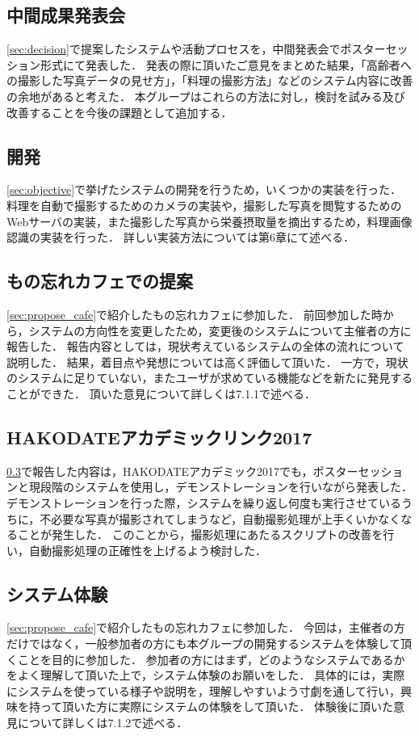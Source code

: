 \documentclass[../report]{subfiles}
\begin{document}
\subsection{中間成果発表会}
\ref{sec:decision}で提案したシステムや活動プロセスを，中間発表会でポスターセッション形式にて発表した．
発表の際に頂いたご意見をまとめた結果，「高齢者への撮影した写真データの見せ方」，「料理の撮影方法」などのシステム内容に改善の余地があると考えた．
本グループはこれらの方法に対し，検討を試みる及び改善することを今後の課題として追加する．

\subsection{開発}
\ref{sec:objective}で挙げたシステムの開発を行うため，いくつかの実装を行った．
料理を自動で撮影するためのカメラの実装や，撮影した写真を閲覧するためのWebサーバの実装，また撮影した写真から栄養摂取量を摘出するため，料理画像認識の実装を行った．
詳しい実装方法については第6章にて述べる．

\subsection{もの忘れカフェでの提案} \label{sec:propose_cafe2}
\ref{sec:propose_cafe}で紹介したもの忘れカフェに参加した．
前回参加した時から，システムの方向性を変更したため，変更後のシステムについて主催者の方に報告した．
報告内容としては，現状考えているシステムの全体の流れについて説明した．
結果，着目点や発想については高く評価して頂いた．
一方で，現状のシステムに足りていない，またユーザが求めている機能などを新たに発見することができた．
頂いた意見について詳しくは7.1.1で述べる．

\subsection{HAKODATEアカデミックリンク2017}
\ref{sec:propose_cafe2}で報告した内容は，HAKODATEアカデミック2017でも，ポスターセッションと現段階のシステムを使用し，デモンストレーションを行いながら発表した．
デモンストレーションを行った際，システムを繰り返し何度も実行させているうちに，不必要な写真が撮影されてしまうなど，自動撮影処理が上手くいかなくなることが発生した．
このことから，撮影処理にあたるスクリプトの改善を行い，自動撮影処理の正確性を上げるよう検討した．

\subsection{システム体験}
\ref{sec:propose_cafe}で紹介したもの忘れカフェに参加した．
今回は，主催者の方だけではなく，一般参加者の方にも本グループの開発するシステムを体験して頂くことを目的に参加した．
参加者の方にはまず，どのようなシステムであるかをよく理解して頂いた上で，システム体験のお願いをした．
具体的には，実際にシステムを使っている様子や説明を，理解しやすいよう寸劇を通して行い，興味を持って頂いた方に実際にシステムの体験をして頂いた．
体験後に頂いた意見について詳しくは7.1.2で述べる．
\end{document}
